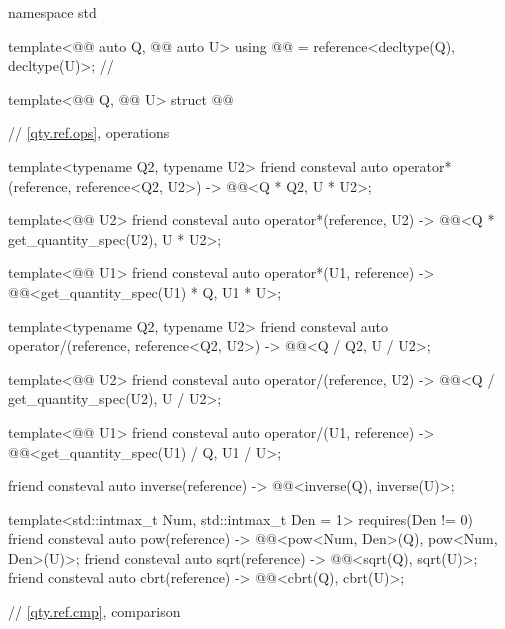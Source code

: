 \begin{codeblock}
namespace std {

template<@@ auto Q, @@ auto U>
using @@ = reference<decltype(Q), decltype(U)>;  // \expos

template<@@ Q, @@ U>
struct @@ {
  // \ref{qty.ref.ops}, operations

  template<typename Q2, typename U2>
  friend consteval auto operator*(reference, reference<Q2, U2>)
    -> @@<Q{} * Q2{}, U{} * U2{}>;

  template<@@ U2>
  friend consteval auto operator*(reference, U2)
    -> @@<Q{} * get_quantity_spec(U2{}), U{} * U2{}>;

  template<@@ U1>
  friend consteval auto operator*(U1, reference)
    -> @@<get_quantity_spec(U1{}) * Q{}, U1{} * U{}>;

  template<typename Q2, typename U2>
  friend consteval auto operator/(reference, reference<Q2, U2>)
    -> @@<Q{} / Q2{}, U{} / U2{}>;

  template<@@ U2>
  friend consteval auto operator/(reference, U2)
    -> @@<Q{} / get_quantity_spec(U2{}), U{} / U2{}>;

  template<@@ U1>
  friend consteval auto operator/(U1, reference)
    -> @@<get_quantity_spec(U1{}) / Q{}, U1{} / U{}>;

  friend consteval auto inverse(reference) -> @@<inverse(Q{}), inverse(U{})>;

  template<std::intmax_t Num, std::intmax_t Den = 1>
    requires(Den != 0)
  friend consteval auto pow(reference) -> @@<pow<Num, Den>(Q{}), pow<Num, Den>(U{})>;
  friend consteval auto sqrt(reference) -> @@<sqrt(Q{}), sqrt(U{})>;
  friend consteval auto cbrt(reference) -> @@<cbrt(Q{}), cbrt(U{})>;

  // \ref{qty.ref.cmp}, comparison

}}
\end{codeblock}
